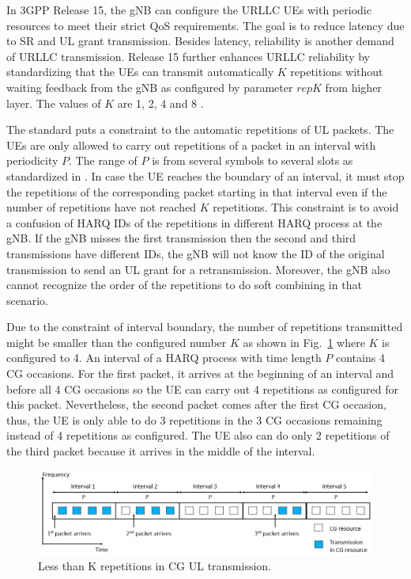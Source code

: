 \documentclass{ieeeaccess}
\begin{document}
In 3GPP Release 15, the gNB can configure the URLLC UEs with periodic resources to meet their strict QoS requirements. The goal is to reduce latency due to SR and UL grant transmission. Besides latency, reliability is another demand of URLLC transmission. Release 15 further enhances URLLC reliability by standardizing that the UEs can transmit automatically $K$ repetitions without waiting feedback from the gNB as configured by parameter $repK$ from higher layer. The values of $K$ are 1, 2, 4 and 8 \cite{ref6}.

The standard puts a constraint to the automatic repetitions of UL packets. The UEs are only allowed to carry out repetitions of a packet in an interval with periodicity $P$. The range of $P$ is from several symbols to several slots as standardized in \cite{ref6}. In case the UE reaches the boundary of an interval, it must stop the repetitions of the corresponding packet starting in that interval even if the number of repetitions have not reached $K$ repetitions. This constraint is to avoid a confusion of HARQ IDs of the repetitions in different HARQ process at the gNB. If the gNB misses the first transmission then the second and third transmissions have different IDs, the gNB will not know the ID of the original transmission to send an UL grant for a retransmission. Moreover, the gNB also cannot recognize the order of the repetitions to do soft combining in that scenario. 

Due to the constraint of interval boundary, the number of repetitions transmitted might be smaller than the configured number $K$ as shown in Fig.~\ref{fig4} where $K$ is configured to 4. An interval of a HARQ process with time length $P$ contains 4 CG occasions. For the first packet, it arrives at the beginning of an interval and before all 4 CG occasions so the UE can carry out 4 repetitions as configured for this packet. Nevertheless, the second packet comes after the first CG occasion, thus, the UE is only able to do 3 repetitions in the 3 CG occasions remaining instead of 4 repetitions as configured. The UE also can do only 2 repetitions of the third packet because it arrives in the middle of the interval. 

\begin{figure}[htbp]
\centerline{\includegraphics[scale=0.33]{fig4.PNG}}
\caption{Less than K repetitions in CG UL transmission.}
\label{fig4}
\vspace{-3mm}
\end{figure}
\end{document}
